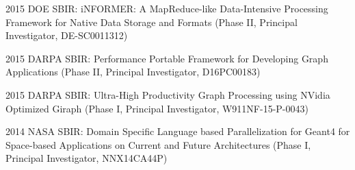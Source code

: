 \begin{itemize}
	2015 DOE SBIR: iNFORMER: A MapReduce-like Data-Intensive Processing
 		Framework for Native Data Storage and Formats (Phase II, Principal
 		Investigator, DE-SC0011312)
 	
 	2015 DARPA SBIR: Performance Portable Framework for
 		Developing Graph Applications (Phase II, Principal Investigator,
 		D16PC00183)
 	
 	2015 DARPA SBIR: Ultra-High Productivity Graph Processing using
 	NVidia Optimized Giraph (Phase I, Principal Investigator,
 	W911NF-15-P-0043)
 	
 	2014 NASA SBIR: Domain Specific Language based
 		Parallelization for Geant4 for Space-based Applications on Current and
 		Future Architectures (Phase I, Principal Investigator, NNX14CA44P)
 	

\end{itemize}
